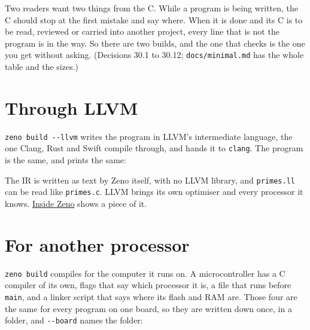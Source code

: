 \begin{why}
Two readers want two things from the C. While a program is being
written, the C should stop at the first mistake and say where. When it
is done and its C is to be read, reviewed or carried into another
project, every line that is not the program is in the way. So there
are two builds, and the one that checks is the one you get without
asking. (Decisions 30.1 to 30.12; \verb|docs/minimal.md| has the whole
table and the sizes.)
\end{why}

\section{Through LLVM}

\verb|zeno build --llvm| writes the program in LLVM's intermediate
language, the one Clang, Rust and Swift compile through, and hands it
to \verb|clang|. The program is the same, and prints the same:


The IR is written as text by Zeno itself, with no LLVM library, and
\verb|primes.ll| can be read like \verb|primes.c|. LLVM brings its own
optimiser and every processor it knows. \hyperref[ch-inside]{Inside
Zeno} shows a piece of it.

\section{For another processor}

\verb|zeno build| compiles for the computer it runs on. A
microcontroller has a C compiler of its own, flags that say which
processor it is, a file that runs before \verb|main|, and a linker
script that says where its flash and RAM are. Those four are the same
for every program on one board, so they are written down once, in a
folder, and \verb|--board| names the folder:


